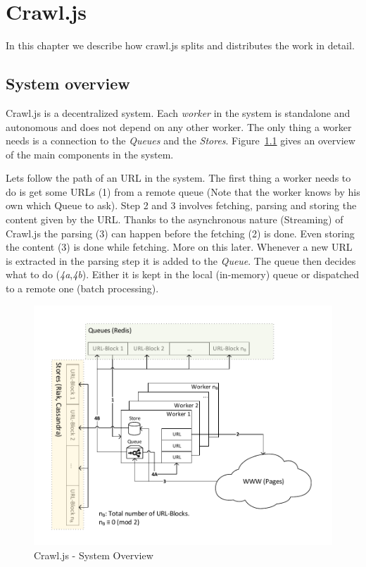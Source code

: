 
\chapter{Crawl.js} %
In this chapter we describe how crawl.js splits and distributes the work in detail.
\label{Chapter4} 

\section{System overview}
Crawl.js is a decentralized system. Each \emph{worker} in the system is standalone and autonomous and does not depend on any other worker. The only thing a worker needs is a connection to the \emph{Queues} and the \emph{Stores}. Figure~\ref{system_overview} gives an overview of the main components in the system.

Lets follow the path of an URL in the system.
The first thing a worker needs to do is get some URLs (1) from a remote queue (Note that the worker knows by his own which Queue to ask). Step 2 and 3 involves fetching, parsing and storing the content given by the URL. Thanks to the asynchronous nature (Streaming) of Crawl.js the parsing (3) can happen before the fetching (2) is done. Even storing the content (3) is done while fetching. More on this later. Whenever a new URL is extracted in the parsing step it is added to the \emph{Queue}. The queue then decides what to do (\emph{4a},\emph{4b}). Either it is kept in the local (in-memory) queue or dispatched to a remote one (batch processing).

\begin{figure}[h]
\centering
  \includegraphics[width=1\textwidth]{Figures/system_overview.pdf}
\caption{Crawl.js - System Overview}
\label{system_overview}
\end{figure}

